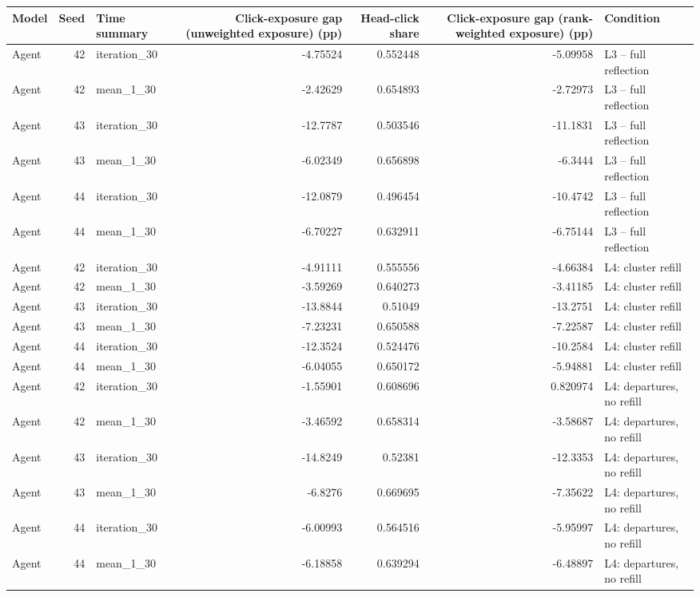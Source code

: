 \begin{table}[htbp!]
\centering
\small
\setlength{\tabcolsep}{3pt}
\renewcommand{\arraystretch}{1.1}
\begin{tabular}{lrlrrrl}
\hline
Model & Seed & Time summary & Click-exposure gap (unweighted exposure) (pp) & Head-click share & Click-exposure gap (rank-weighted exposure) (pp) & Condition \\
\hline
Agent & 42 & iteration\_30 & -4.75524 & 0.552448 & -5.09958 & L3 -- full reflection \\
Agent & 42 & mean\_1\_30 & -2.42629 & 0.654893 & -2.72973 & L3 -- full reflection \\
Agent & 43 & iteration\_30 & -12.7787 & 0.503546 & -11.1831 & L3 -- full reflection \\
Agent & 43 & mean\_1\_30 & -6.02349 & 0.656898 & -6.3444 & L3 -- full reflection \\
Agent & 44 & iteration\_30 & -12.0879 & 0.496454 & -10.4742 & L3 -- full reflection \\
Agent & 44 & mean\_1\_30 & -6.70227 & 0.632911 & -6.75144 & L3 -- full reflection \\
Agent & 42 & iteration\_30 & -4.91111 & 0.555556 & -4.66384 & L4: cluster refill \\
Agent & 42 & mean\_1\_30 & -3.59269 & 0.640273 & -3.41185 & L4: cluster refill \\
Agent & 43 & iteration\_30 & -13.8844 & 0.51049 & -13.2751 & L4: cluster refill \\
Agent & 43 & mean\_1\_30 & -7.23231 & 0.650588 & -7.22587 & L4: cluster refill \\
Agent & 44 & iteration\_30 & -12.3524 & 0.524476 & -10.2584 & L4: cluster refill \\
Agent & 44 & mean\_1\_30 & -6.04055 & 0.650172 & -5.94881 & L4: cluster refill \\
Agent & 42 & iteration\_30 & -1.55901 & 0.608696 & 0.820974 & L4: departures, no refill \\
Agent & 42 & mean\_1\_30 & -3.46592 & 0.658314 & -3.58687 & L4: departures, no refill \\
Agent & 43 & iteration\_30 & -14.8249 & 0.52381 & -12.3353 & L4: departures, no refill \\
Agent & 43 & mean\_1\_30 & -6.8276 & 0.669695 & -7.35622 & L4: departures, no refill \\
Agent & 44 & iteration\_30 & -6.00993 & 0.564516 & -5.95997 & L4: departures, no refill \\
Agent & 44 & mean\_1\_30 & -6.18858 & 0.639294 & -6.48897 & L4: departures, no refill \\

\end{tabular}
\end{table}
